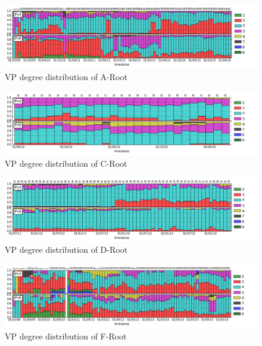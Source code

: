 \begin{appendices}
	\begin{figure}[!htb]
		\centering
		\includegraphics[width=6.5in]{img/peer_degree_diff_a.png}
		\caption{VP degree distribution of A-Root}
		\label{fig:app:peer-deg-dist-diff-a}
	\end{figure}
	\begin{figure}[!htb]
		\centering
		\includegraphics[width=6.5in]{img/peer_degree_diff_c.png}
		\caption{VP degree distribution of C-Root}
		\label{fig:app:peer-deg-dist-diff-c}
	\end{figure}
	\begin{figure}[!htb]
		\centering
		\includegraphics[width=6.5in]{img/peer_degree_diff_d.png}
		\caption{VP degree distribution of D-Root}
		\label{fig:app:peer-deg-dist-diff-d}
	\end{figure}
	\begin{figure}
		\centering
		\includegraphics[width=6.5in]{img/peer_degree_diff_f.png}
		\caption{VP degree distribution of F-Root}
		\label{fig:app:peer-deg-dist-diff-f}
	\end{figure}
	\begin{figure}

\end{figure}
\end{appendices}
